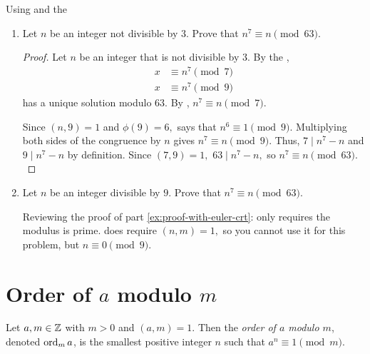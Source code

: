 \documentclass{ximera}
\begin{document}
\begin{br} Using  and the 
	\begin{enumerate}
 		\item\label{ex:proof-with-euler-crt} Let $n$ be an integer not divisible by $3$. Prove that $n^7\equiv n\pmod{63}$.
 		
         \begin{proof}
            Let $n$ be an integer that is not divisible by $3$. By the , 
            \begin{align*}
                x&\equiv n^7 \pmod{7}\\
                x&\equiv n^7 \pmod{9}
            \end{align*} 
            has a unique solution modulo $63.$ 
            By , $n^7\equiv n\pmod{7}.$ 
            
            Since $(n,9)=1$ and $\phi(9)=6,$  says that $n^6\equiv 1\pmod{9}.$ Multiplying both sides of the congruence by $n$ gives $n^7\equiv n\pmod{9}.$ Thus, $7\mid n^7-n$ and $9\mid n^7-n$ by definition. Since $(7,9)=1,$ $63\mid n^7-n,$ so $n^7\equiv n\pmod{63}.$
         \end{proof}

		\item Let $n$ be an integer divisible by $9$. Prove that $n^7\equiv n \pmod{63}$.
		\begin{remark} Reviewing the proof of part \ref{ex:proof-with-euler-crt}:
             only requires the modulus is prime.  does require $(n,m)=1,$ so you cannot use it for this problem, but $n\equiv 0\pmod{9}.$
        \end{remark}
	\end{enumerate}
\end{br}

\section{Order of $a$ modulo $m$}

\begin{definition}\label{defn:order}
    Let $a,m\in\mathbb Z$ with $m>0$ and $(a,m)=1.$ Then the \emph{order of $a$ modulo $m$}, denoted $\operatorname{ord}_m a$, is the smallest positive integer $n$ such that $a^n\equiv 1\pmod{m}.$
\end{definition}
\end{document}
